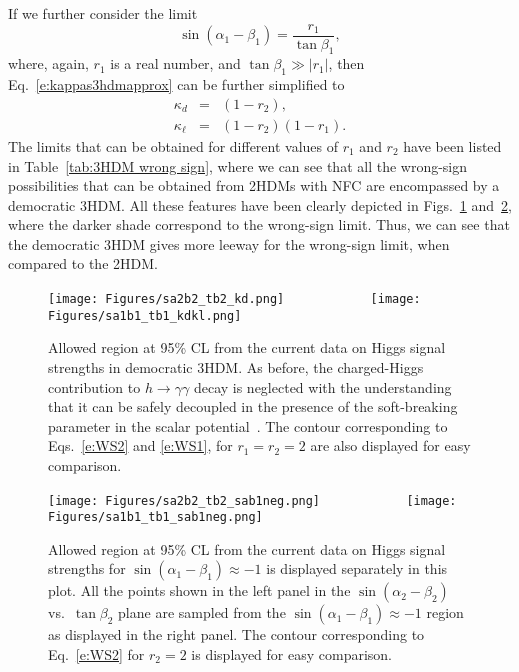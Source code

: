 \documentclass[11pt]{article}
\begin{document}
If we further consider the limit
\begin{equation}
\label{e:WS1}
\sin\left(\alpha_1-\beta_1\right) = \frac{r_1}{\tan\beta_1}, 
\end{equation}
where, again, $r_1$ is a real number, and $\tan\beta_1 \gg \lvert r_1\rvert$, then Eq.~\eqref{e:kappas3hdmapprox} can be further simplified to 
\begin{subequations}
\label{e:ws3hdm}
\begin{eqnarray}
\kappa_d &=& (1-r_2), \\
\kappa_\ell &=& (1-r_2)(1-r_1).
\end{eqnarray}
\end{subequations}
%
The limits that can be obtained for different values of $r_1$ and $r_2$ have been listed in Table~\ref{tab:3HDM wrong sign}, where we can see that all the wrong-sign possibilities that can be obtained from 2HDMs with NFC are encompassed by a democratic 3HDM.  
All these features have been clearly depicted in Figs.~\ref{fig:WS3HDM-1} and~\ref{fig:WS3HDM-2}, where the darker shade correspond to the wrong-sign limit.  
Thus, we can see that the democratic 3HDM gives more leeway for the wrong-sign limit, when compared to the 2HDM.

%
\begin{figure}[h]
\centering
\texttt{[image: Figures/sa2b2\_tb2\_kd.png]} 
~~~~~~~~~~~
\texttt{[image: Figures/sa1b1\_tb1\_kdkl.png]}
\caption{\label{fig:WS3HDM-1}
Allowed region at 95\% CL from the current data on Higgs signal strengths in democratic 3HDM.  
As before, the charged-Higgs contribution to  $h\to\gamma\gamma$ decay is neglected with the understanding that it can be safely decoupled in the presence of the soft-breaking parameter in the scalar potential~\cite{Bhattacharyya:2014oka, Carrolo:2021euy,Faro:2020qyp}.   
The contour corresponding to Eqs.~\eqref{e:WS2} and \eqref{e:WS1}, for $r_1=r_2=2$ are also displayed for easy comparison.  }
\end{figure}
%

%
\begin{figure}[h]
\centering
\texttt{[image: Figures/sa2b2\_tb2\_sab1neg.png]}
~~~~~~~~~~~
\texttt{[image: Figures/sa1b1\_tb1\_sab1neg.png]}
\caption{\label{fig:WS3HDM-2}
Allowed region at 95\% CL from the current data on Higgs signal strengths  for \mbox{$\sin(\alpha_1 - \beta_1) \approx -1$} is displayed separately  in this plot.
All the points shown in the left panel in the $\sin(\alpha_2 - \beta_2)$ vs.\ $\tan\beta_2$ plane are sampled from the $\sin(\alpha_1 - \beta_1) \approx -1$  region as displayed in the right panel.
The contour corresponding to Eq.~\eqref{e:WS2} for $r_2=2$ is displayed for easy comparison.  }
\end{figure}
%
\end{document}
